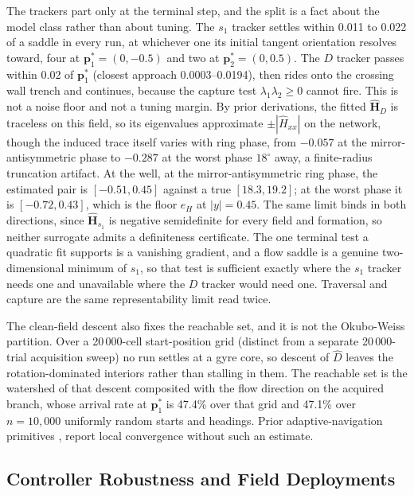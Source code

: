 \documentclass[lettersize,journal]{IEEEtran}
\begin{document}
The trackers part only at the terminal step, and the split is a fact about
the model class rather than about tuning. The $s_1$ tracker settles within
0.011 to 0.022 of a saddle in every run, at whichever one its initial
tangent orientation resolves toward, four at $\mathbf{p}^*_1 = (0, -0.5)$
and two at $\mathbf{p}^*_2 = (0, 0.5)$. The $D$ tracker passes within 0.02
of $\mathbf{p}^*_1$ (closest approach 0.0003--0.0194), then rides onto the
crossing wall trench and continues, because the capture test
$\lambda_1\lambda_2 \geq 0$ cannot fire. This is not a noise floor and not
a tuning margin. By prior derivations, the
fitted $\hat{\mathbf{H}}_D$ is traceless on this field, so its
eigenvalues approximate $\pm|\hat{H}_{xx}|$ on the network, though the
induced trace itself varies with ring phase, from $-0.057$ at the
mirror-antisymmetric phase to $-0.287$ at the worst phase $18^\circ$ away,
a finite-radius truncation artifact. At
the well, at the mirror-antisymmetric ring phase, the estimated pair is
$[-0.51, 0.45]$ against a true $[18.3, 19.2]$; at the worst phase it is
$[-0.72, 0.43]$, which is the floor $e_H$ at $|y| = 0.45$. The same limit binds in
both directions, since $\hat{\mathbf{H}}_{s_1}$ is negative semidefinite
for every field and formation, so neither
surrogate admits a definiteness certificate. The one terminal test a
quadratic fit supports is a vanishing gradient, and a flow saddle is a
genuine two-dimensional minimum of $s_1$, so that test is sufficient
exactly where the $s_1$ tracker needs one and unavailable where the $D$
tracker would need one. Traversal and capture are the same
representability limit read twice.

The clean-field descent also fixes the reachable set, and it is not the
Okubo-Weiss partition. Over a 20\,000-cell start-position grid (distinct
from a separate 20\,000-trial acquisition sweep) no
run settles at a
gyre core, so descent of $\hat{D}$ leaves the rotation-dominated
interiors rather than stalling in them. The reachable set is the
watershed of that descent composited with the flow direction on the
acquired branch, whose arrival rate at $\mathbf{p}^*_1$ is 47.4\% over
that grid and 47.1\% over $n = 10{,}000$ uniformly random starts and
headings. Prior adaptive-navigation primitives \cite{3}, \cite{4} report
local convergence without such an estimate.

\subsection{Controller Robustness and Field Deployments}
\end{document}
